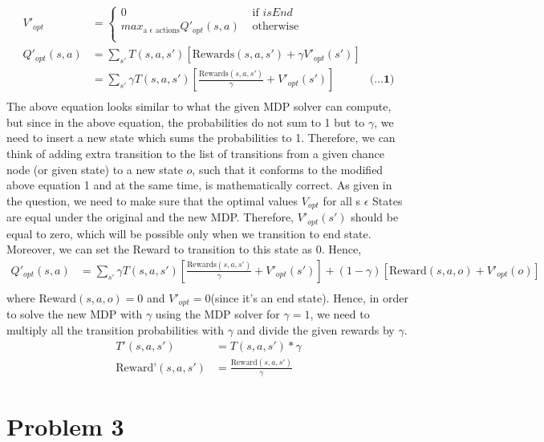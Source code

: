 \documentclass[12pt]{article}
\begin{document}
\begin{enumerate}[label=(\alph*)]
\begin{align*}
	V'_{opt} &= \begin{cases}
	0 & \text{  if $isEnd$} \\
	max_{\text{a } \epsilon \text{ actions}} Q'_{opt}(s, a) & \text{  otherwise} \\
	\end{cases} \\
	Q'_{opt} (s, a) &= \sum_{s'} T(s, a, s')[\text{Rewards} (s,a,s') + \gamma V'_{opt}(s')] \\
	&=\sum_{s'} \gamma T(s, a, s') [\frac{\text{Rewards} (s,a,s')}{\gamma} + V'_{opt}(s')] & \textbf{(...1)} \\
	\end{align*}
	The above equation looks similar to what the given MDP solver can compute, but since in the above equation, the probabilities do not sum to 1 but to $\gamma$, we need to insert a new state which sums the probabilities to 1. Therefore, we can think of adding extra transition to the list of transitions from a given chance node (or given state) to a new state $o$, such that it conforms to the modified above equation 1 and at the same time, is mathematically correct. As given in the question, we need to make sure that the optimal values $V_{opt}$ for all s $\epsilon$ States are equal under the original and the new MDP. Therefore, $V'_{opt}(s')$ should be equal to zero, which will be possible only when we transition to end state. Moreover, we can set the Reward to transition to this state as 0. Hence,
	\begin{align*}
	Q'_{opt} (s, a) &= \sum_{s'} \gamma T(s, a, s') [\frac{\text{Rewards} (s,a,s')}{\gamma} + V'_{opt}(s')]  + (1-\gamma) [\text{Reward} (s, a, o) + V'_{opt}(o)] \\
	\end{align*}
	where Reward$(s,a,o) = 0$ and $V'_{opt} = 0$(since it's an end state).
	Hence, in order to solve the new MDP with $\gamma$ using the MDP solver for $\gamma = 1$, we need to multiply all the transition probabilities with $\gamma$ and divide the given rewards by $\gamma$. \\
	\begin{align*}
		T'(s,a,s') &= T(s,a,s') * \gamma \\
		\text{Reward'} (s,a,s') &= \frac{\text{Reward} (s,a,s')}{\gamma}
	\end{align*}	 
\end{enumerate}

\section*{Problem 3}
\end{document}
